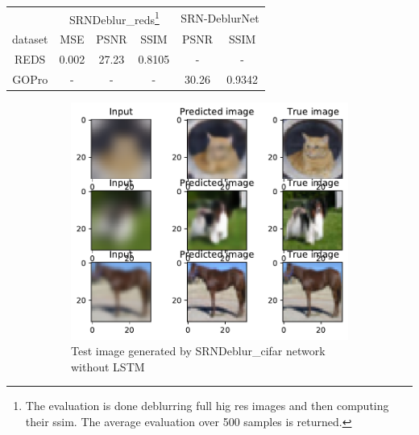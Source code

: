 \begin{tabularx}{300pt}{cccccc}
            & \multicolumn{3}{c}{SRNDeblur\_reds\footnote{The evaluation is done deblurring full hig res images and then computing their ssim. The average evaluation over 500 samples is returned.}} & \multicolumn{2}{c}{SRN-DeblurNet} \\
dataset & MSE & PSNR & SSIM & PSNR & SSIM \\
\hline
REDS & 0.002 & 27.23 & 0.8105 & - & - \\
GOPro & - & - & - & 30.26 & 0.9342 \\
\hline            
\end{tabularx}            
\begin{figure}[H]
    \centering
    \begin{subfigure}{\textwidth}
        \centering
        \includegraphics[height=0.48\textheight]{subsections/srndeblur/cifarnolstmtest.pdf}
        \caption{Test image generated by SRNDeblur\_cifar network without LSTM }
    \end{subfigure} 
    \begin{subfigure}{\textwidth}
        \centering

\end{subfigure}
\end{figure}

